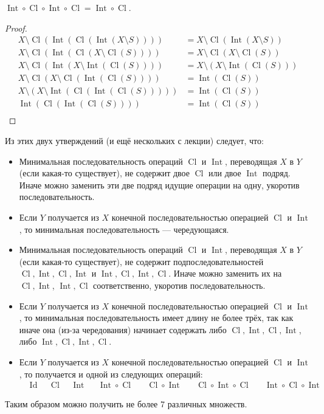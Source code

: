 \documentclass[12pt,a4paper]{article}
\DeclareMathOperator{\Cl}{Cl}
\DeclareMathOperator{\Int}{Int}
\DeclareMathOperator{\Id}{Id}
\begin{document}
\begin{problem}{18}
        \begin{corollary}
            $\Int \circ \Cl \circ \Int \circ \Cl = \Int \circ \Cl$.
        \end{corollary}

        \begin{proof}
            \begin{align*}
                X \setminus \Cl(\Int(\Cl(\Int(X \setminus S)))) &= X \setminus \Cl(\Int(X \setminus S))\\
                X \setminus \Cl(\Int(\Cl(X \setminus \Cl(S)))) &= X \setminus \Cl(X \setminus \Cl(S))\\
                X \setminus \Cl(\Int(X \setminus \Int(\Cl(S)))) &= X \setminus (X \setminus \Int(\Cl(S)))\\
                X \setminus \Cl(X \setminus \Cl(\Int(\Cl(S)))) &= \Int(\Cl(S))\\
                X \setminus (X \setminus \Int(\Cl(\Int(\Cl(S))))) &= \Int(\Cl(S))\\
                \Int(\Cl(\Int(\Cl(S)))) &= \Int(\Cl(S))\\
            \end{align*}
        \end{proof}

        Из этих двух утверждений (и ещё нескольких с лекции) следует, что:
        \begin{itemize}
            \item Минимальная последовательность операций $\Cl$ и $\Int$, переводящая $X$ в $Y$ (если какая-то существует), не содержит двое $\Cl$ или двое $\Int$ подряд. Иначе можно заменить эти две подряд идущие операции на одну, укоротив последовательность.
            \item Если $Y$ получается из $X$ конечной последовательностью операцией $\Cl$ и $\Int$, то минимальная последовательность --- чередующаяся.
            \item Минимальная последовательность операций $\Cl$ и $\Int$, переводящая $X$ в $Y$ (если какая-то существует), не содержит подпоследовательностей $\Cl, \Int, \Cl, \Int$ и $\Int, \Cl, \Int, \Cl$. Иначе можно заменить их на $\Cl, \Int$, $\Int, \Cl$ соответственно, укоротив последовательность.
            \item Если $Y$ получается из $X$ конечной последовательностью операцией $\Cl$ и $\Int$, то минимальная последовательность имеет длину не более трёх, так как иначе она (из-за чередования) начинает содержать либо $\Cl, \Int, \Cl, \Int$, либо $\Int, \Cl, \Int, \Cl$.
            \item Если $Y$ получается из $X$ конечной последовательностью операцией $\Cl$ и $\Int$, то получается и одной из следующих операций:
                \begin{align*}
                    &\Id&
                    &\Cl&
                    &\Int&
                    &\Int\circ\Cl&
                    &\Cl\circ\Int&
                    &\Cl\circ\Int\circ\Cl&
                    &\Int\circ\Cl\circ\Int
                \end{align*}
        \end{itemize}
        Таким образом можно получить не более 7 различных множеств.


\end{problem}
\end{document}
